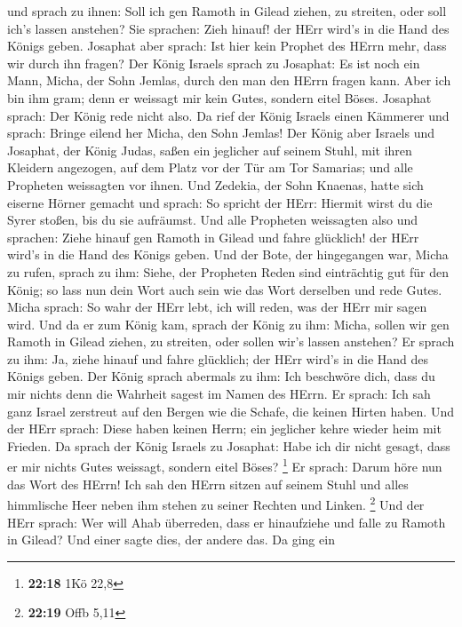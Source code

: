und sprach zu ihnen: Soll ich gen Ramoth in Gilead ziehen, zu streiten,
oder soll ich's lassen anstehen? Sie sprachen: Zieh hinauf! der HErr
wird's in die Hand des Königs geben.  Josaphat aber sprach:
Ist hier kein Prophet des HErrn mehr, dass wir durch ihn fragen?
 Der König Israels sprach zu Josaphat: Es ist noch ein Mann,
Micha, der Sohn Jemlas, durch den man den HErrn fragen kann. Aber ich
bin ihm gram; denn er weissagt mir kein Gutes, sondern eitel Böses.
Josaphat sprach: Der König rede nicht also.  Da rief der
König Israels einen Kämmerer und sprach: Bringe eilend her Micha, den
Sohn Jemlas!  Der König aber Israels und Josaphat, der
König Judas, saßen ein jeglicher auf seinem Stuhl, mit ihren Kleidern
angezogen, auf dem Platz vor der Tür am Tor Samarias; und alle Propheten
weissagten vor ihnen.  Und Zedekia, der Sohn Knaenas, hatte
sich eiserne Hörner gemacht und sprach: So spricht der HErr: Hiermit
wirst du die Syrer stoßen, bis du sie aufräumst.  Und alle
Propheten weissagten also und sprachen: Ziehe hinauf gen Ramoth in
Gilead und fahre glücklich! der HErr wird's in die Hand des Königs
geben.  Und der Bote, der hingegangen war, Micha zu rufen,
sprach zu ihm: Siehe, der Propheten Reden sind einträchtig gut für den
König; so lass nun dein Wort auch sein wie das Wort derselben und rede
Gutes.  Micha sprach: So wahr der HErr lebt, ich will
reden, was der HErr mir sagen wird.  Und da er zum König
kam, sprach der König zu ihm: Micha, sollen wir gen Ramoth in Gilead
ziehen, zu streiten, oder sollen wir's lassen anstehen? Er sprach zu
ihm: Ja, ziehe hinauf und fahre glücklich; der HErr wird's in die Hand
des Königs geben.  Der König sprach abermals zu ihm: Ich
beschwöre dich, dass du mir nichts denn die Wahrheit sagest im Namen des
HErrn.  Er sprach: Ich sah ganz Israel zerstreut auf den
Bergen wie die Schafe, die keinen Hirten haben. Und der HErr sprach:
Diese haben keinen Herrn; ein jeglicher kehre wieder heim mit Frieden.
 Da sprach der König Israels zu Josaphat: Habe ich dir
nicht gesagt, dass er mir nichts Gutes weissagt, sondern eitel Böses?
\footnote{\textbf{22:18} 1Kö 22,8}  Er sprach: Darum höre
nun das Wort des HErrn! Ich sah den HErrn sitzen auf seinem Stuhl und
alles himmlische Heer neben ihm stehen zu seiner Rechten und Linken.
\footnote{\textbf{22:19} Offb 5,11}  Und der HErr sprach:
Wer will Ahab überreden, dass er hinaufziehe und falle zu Ramoth in
Gilead? Und einer sagte dies, der andere das.  Da ging ein
